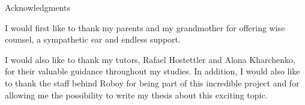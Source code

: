 \thispagestyle{empty}

\vspace*{20mm}

\begin{center}
{ Acknowledgments}
\end{center}

\vspace{10mm}
I would first like to thank my parents and my grandmother for offering wise counsel, a sympathetic ear and endless support.
\par
I would also like to thank my tutors, Rafael Hostettler and Alona Kharchenko, for their valuable guidance throughout my studies. In addition, I would also like to thank the staff behind Roboy  for being part of this incredible project and for allowing me the possibility to write my thesis about this exciting topic.

\cleardoublepage{}
